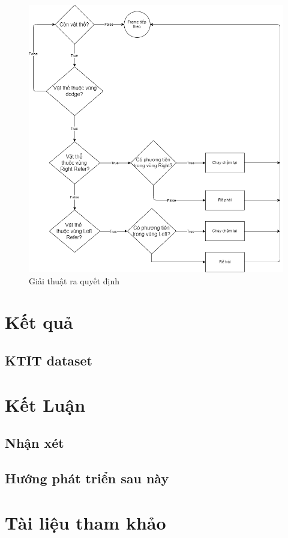 \documentclass[a4paper,10pt]{article}
\begin{document}
		\begin{figure}[h]
 		\label{fig:flowchart}
		\begin{center}
		\includegraphics[width=.8\textwidth]{image/algo-flowchart.png} %
		\caption{Giải thuật ra quyết định}
		\end{center}
		\end{figure}	

	
	
\section{Kết quả}
    \subsection{KTIT dataset}
\section{Kết Luận}
    \subsection{Nhận xét}
    \subsection{Hướng phát triển sau này}
\section{Tài liệu tham khảo}
\end{document}
